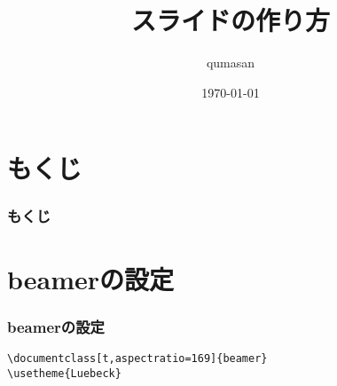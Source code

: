 \documentclass[t,aspectratio=169]{beamer}
\title{スライドの作り方}
\author{qumasan}
\institute{qumasan}
\date{\today}
\begin{document}
\begin{frame}
\maketitle
\end{frame}

\section*{もくじ}
\begin{frame}
    \frametitle{もくじ}
    \tableofcontents
\end{frame}

\section{beamerの設定}
\begin{frame}[fragile]
    \frametitle{beamerの設定}
    \begin{verbatim}
\documentclass[t,aspectratio=169]{beamer}
\usetheme{Luebeck}
    \end{verbatim}
\end{frame}







\end{document}
